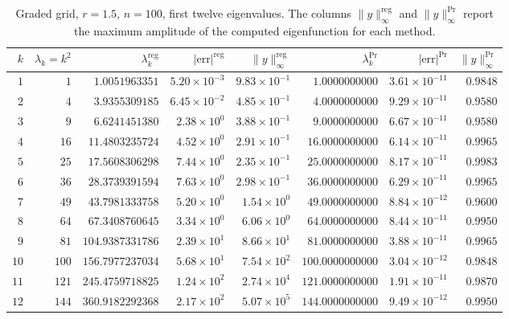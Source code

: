 \documentclass[12pt,reqno]{amsart}
\numberwithin{equation}{section}
\begin{document}
\begin{table}[ht]
\centering\footnotesize
\setlength{\tabcolsep}{4pt}
\begin{tabular}{rrrrrrrr}
\toprule
$k$ & $\lambda_k = k^2$ & $\lambda_k^{\text{reg}}$ & $|\text{err}|^{\text{reg}}$ & $\|y\|_\infty^{\text{reg}}$ & $\lambda_k^{\text{Pr}}$ & $|\text{err}|^{\text{Pr}}$ & $\|y\|_\infty^{\text{Pr}}$ \\
\midrule
$1$  & $1$   & $1.0051963351$    & $5.20\times 10^{-3}$ & $9.83\times 10^{-1}$  & $1.0000000000$   & $3.61\times 10^{-11}$ & $0.9848$ \\
$2$  & $4$   & $3.9355309185$    & $6.45\times 10^{-2}$ & $4.85\times 10^{-1}$  & $4.0000000000$   & $9.29\times 10^{-11}$ & $0.9580$ \\
$3$  & $9$   & $6.6241451380$    & $2.38\times 10^{0}$  & $3.88\times 10^{-1}$  & $9.0000000000$   & $6.67\times 10^{-11}$ & $0.9580$ \\
$4$  & $16$  & $11.4803235724$   & $4.52\times 10^{0}$  & $2.91\times 10^{-1}$  & $16.0000000000$  & $6.14\times 10^{-11}$ & $0.9965$ \\
$5$  & $25$  & $17.5608306298$   & $7.44\times 10^{0}$  & $2.35\times 10^{-1}$  & $25.0000000000$  & $8.17\times 10^{-11}$ & $0.9983$ \\
$6$  & $36$  & $28.3739391594$   & $7.63\times 10^{0}$  & $2.98\times 10^{-1}$  & $36.0000000000$  & $6.29\times 10^{-11}$ & $0.9965$ \\
$7$  & $49$  & $43.7981333758$   & $5.20\times 10^{0}$  & $1.54\times 10^{0}$   & $49.0000000000$  & $8.84\times 10^{-12}$ & $0.9600$ \\
$8$  & $64$  & $67.3408760645$   & $3.34\times 10^{0}$  & $6.06\times 10^{0}$   & $64.0000000000$  & $8.44\times 10^{-11}$ & $0.9950$ \\
$9$  & $81$  & $104.9387331786$  & $2.39\times 10^{1}$  & $8.66\times 10^{1}$   & $81.0000000000$  & $3.88\times 10^{-11}$ & $0.9965$ \\
$10$ & $100$ & $156.7977237034$  & $5.68\times 10^{1}$  & $7.54\times 10^{2}$   & $100.0000000000$ & $3.04\times 10^{-12}$ & $0.9848$ \\
$11$ & $121$ & $245.4759718825$  & $1.24\times 10^{2}$  & $2.74\times 10^{4}$   & $121.0000000000$ & $1.91\times 10^{-11}$ & $0.9870$ \\
$12$ & $144$ & $360.9182292368$  & $2.17\times 10^{2}$  & $5.07\times 10^{5}$   & $144.0000000000$ & $9.49\times 10^{-12}$ & $0.9950$ \\
\bottomrule
\end{tabular}
\caption{Graded grid, $r = 1.5$, $n = 100$, first twelve eigenvalues. The columns $\|y\|_\infty^{\text{reg}}$ and $\|y\|_\infty^{\text{Pr}}$ report the maximum amplitude of the computed eigenfunction for each method.}
\label{tab:amplitude}
\end{table}
\end{document}
